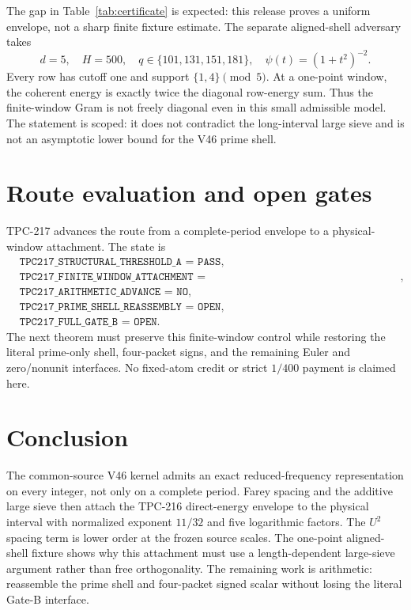 \documentclass[11pt]{article}
\theoremstyle{definition}
\theoremstyle{remark}
\begin{document}
The gap in Table~\ref{tab:certificate} is expected: this release proves a
uniform envelope, not a sharp finite fixture estimate.  The separate
aligned-shell adversary takes
\[
 d=5,\quad H=500,\quad q\in\{101,131,151,181\},
 \quad \psi(t)=(1+t^2)^{-2}.
\]
Every row has cutoff one and support $\{1,4\}\pmod 5$.  At a one-point window,
the coherent energy is exactly twice the diagonal row-energy sum.  Thus the
finite-window Gram is not freely diagonal even in this small admissible model.
The statement is scoped: it does not contradict the long-interval large sieve
and is not an asymptotic lower bound for the V46 prime shell.

\section{Route evaluation and open gates}

TPC-217 advances the route from a complete-period envelope to a physical-window
attachment.  The state is
\begin{align*}
 &\texttt{TPC217\_STRUCTURAL\_THRESHOLD\_A = PASS},\\
 &\texttt{TPC217\_FINITE\_WINDOW\_ATTACHMENT
   = PROVED\_X\_11\_OVER\_32\_LOG\_FIVE\_NORMALIZED},\\
 &\texttt{TPC217\_ARITHMETIC\_ADVANCE = NO},\\
 &\texttt{TPC217\_PRIME\_SHELL\_REASSEMBLY = OPEN},\\
 &\texttt{TPC217\_FULL\_GATE\_B = OPEN}.
\end{align*}
The next theorem must preserve this finite-window control while restoring the
literal prime-only shell, four-packet signs, and the remaining Euler and
zero/nonunit interfaces.  No fixed-atom credit or strict $1/400$ payment is
claimed here.

\section{Conclusion}

The common-source V46 kernel admits an exact reduced-frequency representation
on every integer, not only on a complete period.  Farey spacing and the
additive large sieve then attach the TPC-216 direct-energy envelope to the
physical interval with normalized exponent $11/32$ and five logarithmic
factors.  The $U^2$ spacing term is lower order at the frozen source scales.
The one-point aligned-shell fixture shows why this attachment must use a
length-dependent large-sieve argument rather than free orthogonality.  The
remaining work is arithmetic: reassemble the prime shell and four-packet
signed scalar without losing the literal Gate-B interface.



\end{document}
